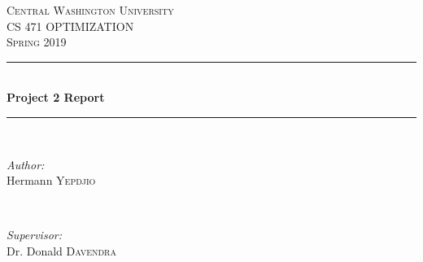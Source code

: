 \documentclass[12pt]{article}
\begin{document}
	
	\begin{titlepage}
		
		\newcommand{\HRule}{\rule{\linewidth}{0.5mm}} %
		
		\center %
		
		
		\textsc{\LARGE Central Washington University}\\[1.5cm] %
		\textsc{\Large CS 471 OPTIMIZATION}\\[0.5cm] %
		\textsc{\large Spring 2019}\\[0.5cm] %
		
		
		\HRule \\[0.4cm]
		{ \huge \bfseries Project 2 Report}\\[0.4cm] %
		\HRule \\[1.5cm]
		
		
		\begin{minipage}{0.4\textwidth}
			\begin{flushleft} \large
				\emph{Author:}\\
				Hermann \textsc{Yepdjio} %
			\end{flushleft}
		\end{minipage}
		~
		\begin{minipage}{0.4\textwidth}
			\begin{flushright} \large
				\emph{Supervisor:} \\
				Dr. Donald \textsc{Davendra} %
			\end{flushright}
		\end{minipage}\\[1cm]
		

\end{titlepage}
\end{document}
